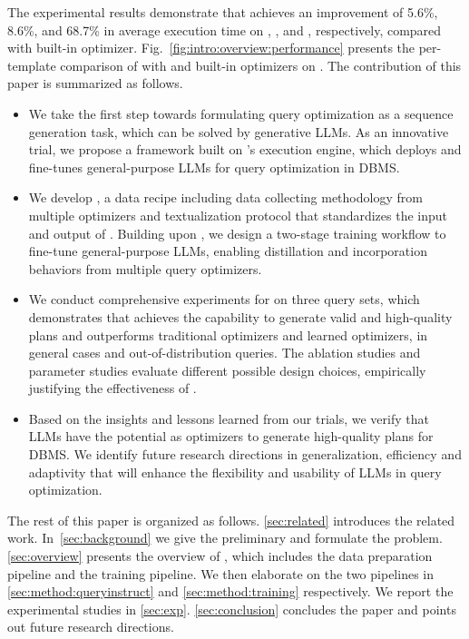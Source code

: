 The experimental results demonstrate that \LLMQO achieves an improvement of 5.6\%, 8.6\%, and 68.7\% in average execution time on \imdb, \job, and \dsb, respectively, compared with \Postgres built-in optimizer. Fig.~\ref{fig:intro:overview:performance} presents the per-template comparison of \LLMQO with \Postgres and \Oracle built-in optimizers on \dsb.
The contribution of this paper is summarized as follows.
\begin{itemize}[leftmargin=*]
    \item %
    We take the first step towards formulating query optimization as a sequence generation task, which can be solved by generative LLMs. As an innovative trial, we propose a framework \LLMQO built on \Postgres's execution engine, which deploys and fine-tunes general-purpose LLMs for query optimization in DBMS. 
    \item We develop \QueryInstruct,  a data recipe including data collecting methodology from multiple optimizers and textualization protocol that standardizes the input and output of \LLMQO. Building upon \QueryInstruct, we design a two-stage training workflow to fine-tune general-purpose LLMs, enabling distillation and incorporation behaviors from multiple query optimizers.
    \item We conduct comprehensive experiments for \LLMQO on three query sets, which demonstrates that \LLMQO achieves the capability to generate valid and high-quality plans and outperforms traditional optimizers and learned optimizers, in general cases and out-of-distribution queries. The ablation studies and parameter studies evaluate different possible design choices, empirically justifying the effectiveness of \LLMQO.
    \item Based on the insights and lessons learned from our trials, we verify that LLMs have the potential as optimizers to generate high-quality plans for DBMS. We identify future research directions in generalization, efficiency and adaptivity that will enhance the flexibility and usability of LLMs in query optimization. 
\end{itemize}

 The rest of this paper is organized as follows. \cref{sec:related} introduces the related work. In~\cref{sec:background} we give the preliminary and formulate the problem. 
\cref{sec:overview} presents the overview of \LLMQO, which includes the data preparation pipeline and the training pipeline. We then elaborate on the two pipelines in \cref{sec:method:queryinstruct} and \cref{sec:method:training} respectively. We report the experimental studies in \cref{sec:exp}. \cref{sec:conclusion} concludes the paper and points out future research directions.
